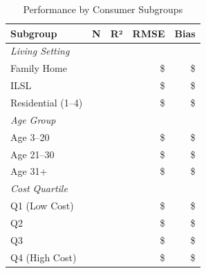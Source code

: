 \begin{table}[h]
\centering
\caption{Performance by Consumer Subgroups}
\begin{tabular}{lrrrr}
\toprule
\textbf{Subgroup} & \textbf{N} & \textbf{R²} & \textbf{RMSE} & \textbf{Bias} \\
\midrule
\multicolumn{5}{l}{\textit{Living Setting}} \\
Family Home & \ModelThreeSubgrouplivingFHN{} & \ModelThreeSubgrouplivingFHRSquared{} & \$\ModelThreeSubgrouplivingFHRMSE{} & \$\ModelThreeSubgrouplivingFHBias{} \\
ILSL & \ModelThreeSubgrouplivingILSLN{} & \ModelThreeSubgrouplivingILSLRSquared{} & \$\ModelThreeSubgrouplivingILSLRMSE{} & \$\ModelThreeSubgrouplivingILSLBias{} \\
Residential (1--4) & \ModelThreeSubgrouplivingRHOneToFourN{} & \ModelThreeSubgrouplivingRHOneToFourRSquared{} & \$\ModelThreeSubgrouplivingRHOneToFourRMSE{} & \$\ModelThreeSubgrouplivingRHOneToFourBias{} \\
\midrule
\multicolumn{5}{l}{\textit{Age Group}} \\
Age 3--20 & \ModelThreeSubgroupageAgeUnderTwentyOneN{} & \ModelThreeSubgroupageAgeUnderTwentyOneRSquared{} & \$\ModelThreeSubgroupageAgeUnderTwentyOneRMSE{} & \$\ModelThreeSubgroupageAgeUnderTwentyOneBias{} \\
Age 21--30 & \ModelThreeSubgroupageAgeTwentyOneToThirtyN{} & \ModelThreeSubgroupageAgeTwentyOneToThirtyRSquared{} & \$\ModelThreeSubgroupageAgeTwentyOneToThirtyRMSE{} & \$\ModelThreeSubgroupageAgeTwentyOneToThirtyBias{} \\
Age 31+ & \ModelThreeSubgroupageAgeThirtyOnePlusN{} & \ModelThreeSubgroupageAgeThirtyOnePlusRSquared{} & \$\ModelThreeSubgroupageAgeThirtyOnePlusRMSE{} & \$\ModelThreeSubgroupageAgeThirtyOnePlusBias{} \\
\midrule
\multicolumn{5}{l}{\textit{Cost Quartile}} \\
Q1 (Low Cost) & \ModelThreeSubgroupcostQOneLowN{} & \ModelThreeSubgroupcostQOneLowRSquared{} & \$\ModelThreeSubgroupcostQOneLowRMSE{} & \$\ModelThreeSubgroupcostQOneLowBias{} \\
Q2 & \ModelThreeSubgroupcostQTwoN{} & \ModelThreeSubgroupcostQTwoRSquared{} & \$\ModelThreeSubgroupcostQTwoRMSE{} & \$\ModelThreeSubgroupcostQTwoBias{} \\
Q3 & \ModelThreeSubgroupcostQThreeN{} & \ModelThreeSubgroupcostQThreeRSquared{} & \$\ModelThreeSubgroupcostQThreeRMSE{} & \$\ModelThreeSubgroupcostQThreeBias{} \\
Q4 (High Cost) & \ModelThreeSubgroupcostQFourHighN{} & \ModelThreeSubgroupcostQFourHighRSquared{} & \$\ModelThreeSubgroupcostQFourHighRMSE{} & \$\ModelThreeSubgroupcostQFourHighBias{} \\
\bottomrule
\end{tabular}
\end{table}

